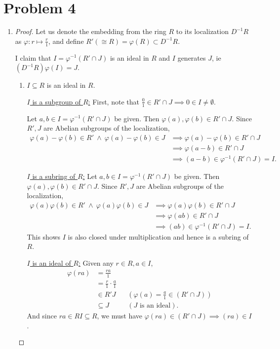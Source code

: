\documentclass{article}
\theoremstyle{plain}
\begin{document}
\section*{Problem 4}
\begin{enumerate}
\item \begin{proof}
  Let us denote the embedding from the ring $R$ to its localization $D^{-1}R$ as
  $\varphi:r\mapsto\frac{r}{1}$, and define $R'(\cong R)=\varphi(R)\subset D^{-1}R$.

  I claim that $I=\varphi^{-1}(R'\cap J)$ is an ideal in $R$ and $I$ generates $J$, ie
  $(D^{-1}R)\varphi(I)=J$.
  \begin{enumerate}
    \item $I\subseteq R$ is an ideal in $R$.

          \underline{$I$ is a subgroup of $R$:} First, note that
          $\frac{0}{1}\in R'\cap J\implies 0\in I\neq\emptyset$.

          Let $a,b\in I=\varphi^{-1}(R'\cap J)$ be
          given. Then $\varphi(a), \varphi(b)\in R'\cap J$. Since $R',J$ are Abelian subgroups of
          the localization,
          \begin{align*}
            \varphi(a)-\varphi(b)\in R'\ \wedge\ \varphi(a)-\varphi(b)\in J&\implies\varphi(a)-\varphi(b)\in R'\cap J\\
                                         &\implies \varphi(a-b)\in R'\cap J\\
                                         &\implies (a-b)\in\varphi^{-1}(R'\cap J)=I.
          \end{align*}

      \underline{$I$ is a subring of $R$:}
          Let $a,b\in I=\varphi^{-1}(R'\cap J)$ be
          given. Then $\varphi(a), \varphi(b)\in R'\cap J$. Since $R',J$ are Abelian subgroups of
          the localization,
          \begin{align*}
            \varphi(a)\varphi(b)\in R'\ \wedge\ \varphi(a)\varphi(b)\in J&\implies\varphi(a)\varphi(b)\in R'\cap J\\
                                         &\implies \varphi(ab)\in R'\cap J\\
                                         &\implies (ab)\in\varphi^{-1}(R'\cap J)=I.
          \end{align*}
          This shows $I$ is also closed under multiplication and hence is a
          subring of $R$.

      \underline{$I$ is an ideal of $R$:}
      Given any $r\in R, a\in I$,
      \begin{align*}
        \varphi(ra) &= \frac{ra}{1}\\
        &=\frac{r}{1}\cdot\frac{a}{1}\\
              &\in R' J && (\varphi(a)=\frac{a}{1}\in (R'\cap J))\\
        &\subseteq J &&(J \text{ is an ideal}).
      \end{align*}
      And since $ra\in RI\subseteq R$, we must have $\varphi(ra)\in(R'\cap J)\implies (ra)\in I$.


\end{enumerate}
\end{proof}
\end{enumerate}
\end{document}
